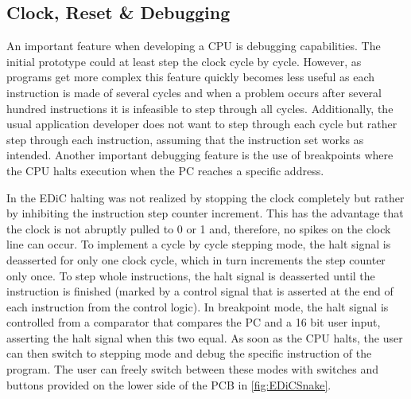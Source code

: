 \subsection{Clock, Reset \& Debugging}\label{sec:clock}
An important feature when developing a \gls{CPU} is debugging capabilities.
The initial prototype could at least step the clock cycle by cycle.
However, as programs get more complex this feature quickly becomes less useful as each instruction is made of several cycles and when a problem occurs after several hundred instructions it is infeasible to step through all cycles.
Additionally, the usual application developer does not want to step through each cycle but rather step through each instruction, assuming that the instruction set works as intended.
Another important debugging feature is the use of breakpoints where the \gls{CPU} halts execution when the \gls{PC} reaches a specific address.

In the \gls{EDiC} halting was not realized by stopping the clock completely but rather by inhibiting the instruction step counter increment.
This has the advantage that the clock is not abruptly pulled to 0 or 1 and, therefore, no spikes on the clock line can occur.
To implement a cycle by cycle stepping mode, the halt signal is deasserted for only one clock cycle, which in turn increments the step counter only once.
To step whole instructions, the halt signal is deasserted until the instruction is finished (marked by a control signal that is asserted at the end of each instruction from the control logic).
In breakpoint mode, the halt signal is controlled from a comparator that compares the \gls{PC} and a 16 bit user input, asserting the halt signal when this two equal.
As soon as the \gls{CPU} halts, the user can then switch to stepping mode and debug the specific instruction of the program.
The user can freely switch between these modes with switches and buttons provided on the lower side of the \gls{PCB} in \cref{fig:EDiCSnake}.

